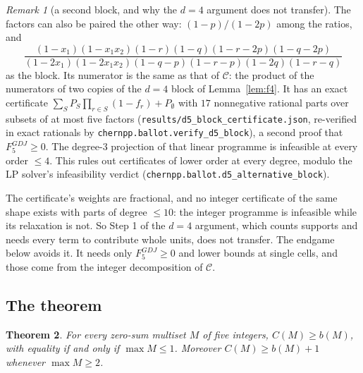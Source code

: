 \documentclass[11pt,a4paper]{article}
\theoremstyle{plain}
\newtheorem{theorem}{Theorem}
\theoremstyle{definition}
\theoremstyle{remark}
\newtheorem{remark}[theorem]{Remark}
\begin{document}
\begin{remark}[a second block, and why the $d = 4$ argument does not transfer]
The factors can also be paired the other way: $(1-p)/(1-2p)$ among the ratios, and
\[
  \frac{(1-x_1)(1-x_1x_2)(1-r)(1-q)(1-r-2p)(1-q-2p)}{(1-2x_1)(1-2x_1x_2)(1-q-p)(1-r-p)(1-2q)(1-r-q)}
\]
as the block. Its numerator is the same as that of $\mathcal C$: the product of the numerators of
two copies of the $d = 4$ block of Lemma~\ref{lem:f4}. It has an exact certificate
$\sum_S P_S \prod_{r \in S}(1 - f_r) + P_\emptyset$ with $17$ nonnegative rational parts over subsets of at
most five factors (\texttt{results/d5\_block\_certificate.json}, re-verified in exact rationals by
\texttt{chernpp.ballot.verify\_d5\_block}), a second proof that $F_5^{GDJ} \ge 0$. The degree-$3$
projection of that linear programme is infeasible at every order $\le 4$. This rules out
certificates of lower order at every degree, modulo the LP solver's infeasibility verdict
(\texttt{chernpp.ballot.d5\_alternative\_block}).

The certificate's weights are fractional, and no integer certificate of the same shape exists with
parts of degree $\le 10$: the integer programme is infeasible while its relaxation is not. So Step 1
of the $d = 4$ argument, which counts supports and needs every term to contribute whole units, does
not transfer. The endgame below avoids it. It needs only $F_5^{GDJ} \ge 0$ and lower bounds at
single cells, and those come from the integer decomposition of $\mathcal C$.
\end{remark}

\subsection{The theorem}

\begin{theorem}\label{thm:d5}
For every zero-sum multiset $M$ of five integers, $C(M) \ge b(M)$, with equality if and only if
$\max M \le 1$. Moreover $C(M) \ge b(M) + 1$ whenever $\max M \ge 2$.
\end{theorem}
\end{document}

